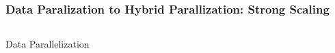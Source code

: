 \documentclass{beamer}
\begin{document}
\begin{frame}
\frametitle{Data Paralization to Hybrid Parallization: Strong Scaling}
\begin{columns}
\begin{column}{6cm}
  \begin{center}
\vspace{-1em}\small    Data Parallelization    
  \end{center}
\end{column}
\begin{column}{6cm}

\end{column}
\end{columns}
\end{frame}
\end{document}
